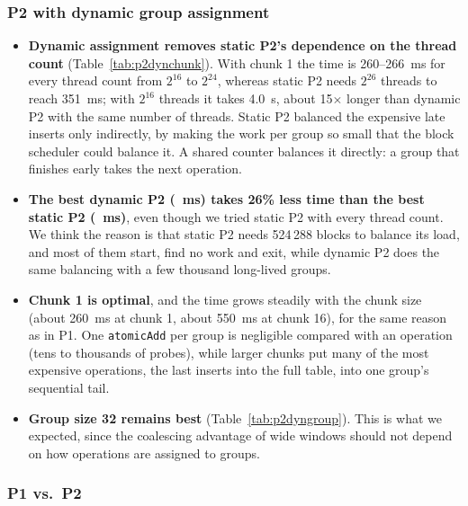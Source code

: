 \subsubsection*{P2 with dynamic group assignment}

\begin{itemize}
\item \textbf{Dynamic assignment removes static P2's dependence on the thread
  count} (Table~\ref{tab:p2dynchunk}). With chunk 1 the time is 260--266~ms for
  every thread count from $2^{16}$ to $2^{24}$, whereas static P2 needs
  $2^{26}$ threads to reach 351~ms; with $2^{16}$ threads it takes 4.0~s, about
  15$\times$ longer than dynamic P2 with the same number of threads. Static P2 balanced the expensive late inserts only indirectly, by
  making the work per group so small that the block scheduler could balance it.
  A shared counter balances it directly: a group that finishes early takes the
  next operation.
\item \textbf{The best dynamic P2 (\ptwodynbestms~ms) takes 26\% less time than the best
  static P2 (\ptwobestms~ms)}, even though we tried static P2 with every thread
  count. We think the reason is that static P2 needs 524\,288 blocks to balance its
  load, and most of them start, find no work and exit, while dynamic P2 does the same
  balancing with a few thousand long-lived groups.
\item \textbf{Chunk 1 is optimal}, and the time grows steadily with the chunk
  size (about 260~ms at chunk 1, about 550~ms at chunk 16), for the same reason as
  in P1. One \texttt{atomicAdd} per group is negligible compared with an operation
  (tens to thousands of probes), while larger chunks put many of the most
  expensive operations, the last inserts into the full table, into one group's
  sequential tail.
\item \textbf{Group size 32 remains best} (Table~\ref{tab:p2dyngroup}). This is
  what we expected, since the coalescing advantage of wide windows should not depend
  on how operations are assigned to groups.
\end{itemize}

\subsubsection*{P1 vs.\ P2}

